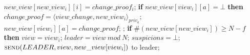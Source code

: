 \begin{algorithm}
\begin{algorithmic}[1]
		\State
		\State \hspace{\algorithmicindent} $new\_view[new\_view_i][i] = change\_proof_i$;
		\State \hspace{\algorithmicindent} \textbf{if} $new\_view[view_i][a] = \bot$ \textbf{then}				
		\State \hspace{\algorithmicindent}\hspace{\algorithmicindent} $change\_proof = \langle view\_change, new\_view_i \rangle_{priv_a}$;
		\State \hspace{\algorithmicindent}\hspace{\algorithmicindent} $new\_view[view_i][a] = change\_proof$;
		\State \hspace{\algorithmicindent}\hspace{\algorithmicindent}  ;
		\State
		\State \hspace{\algorithmicindent} \textbf{if} $\#(new\_view[new\_view_i]) \geq N-f$ \textbf{then}
		\State \hspace{\algorithmicindent}\hspace{\algorithmicindent} $view = view_i$;
		\State \hspace{\algorithmicindent}\hspace{\algorithmicindent} $leader = view\ mod\ N$;
		\State \hspace{\algorithmicindent}\hspace{\algorithmicindent} $suspicions = \bot$;
		\State \hspace{\algorithmicindent}\hspace{\algorithmicindent} $\Call{send}{LEADER, view, new\_view[view_i]}$ to leader;
	\end{algorithmic}
\end{algorithm}

